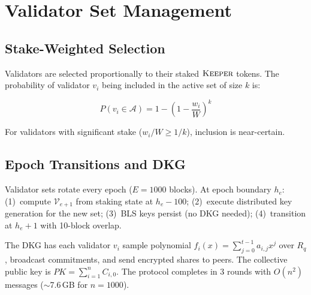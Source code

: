 \section{Validator Set Management}


\subsection{Stake-Weighted Selection}

Validators are selected proportionally to their staked $\textsc{Keeper}$ tokens. The probability of validator $v_i$ being included in the active set of size $k$ is:

\begin{equation}
P(v_i \in \mathcal{A}) = 1 - \left(1 - \frac{w_i}{W}\right)^k
\end{equation}

For validators with significant stake ($w_i / W \geq 1/k$), inclusion is near-certain.

\subsection{Epoch Transitions and DKG}

Validator sets rotate every epoch ($E = 1000$ blocks). At epoch boundary $h_e$: (1)~compute $\mathcal{V}_{e+1}$ from staking state at $h_e - 100$; (2)~execute \Ringtail{} distributed key generation for the new set; (3)~BLS keys persist (no DKG needed); (4)~transition at $h_e + 1$ with 10-block overlap.

The \Ringtail{} DKG has each validator $v_i$ sample polynomial $f_i(x) = \sum_{j=0}^{t-1} a_{i,j} x^j$ over $R_q$, broadcast commitments, and send encrypted shares to peers. The collective public key is $PK = \sum_{i=1}^{n} C_{i,0}$. The protocol completes in 3 rounds with $O(n^2)$ messages ($\sim$7.6\,GB for $n = 1000$).

